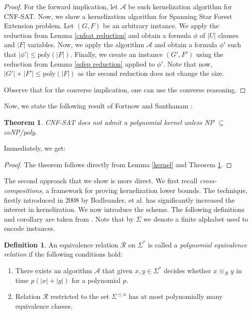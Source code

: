 \documentclass[en]{pracamgr}
\newtheorem{theorem}{Theorem}
\theoremstyle{definition}
\newtheorem{definition}{Definition}
\newcommand{\ssfep}{{\sc Spanning Star Forest Extension}}
\newcommand{\cnfsat}{{\sc CNF-SAT}}
\begin{document}
\begin{proof}
	For the forward implication, let $\mathcal{A}$ be such kernelization algorithm for \cnfsat{}. Now, we show a kernelization algorithm for \ssfep{} problem. Let $(G,F)$ be an arbitrary instance. We apply the reduction from Lemma \ref{cnfsat reduction} and obtain a formula $\phi$ of $|U|$ clauses and $|F|$ variables. Now, we apply the algorithm $\mathcal{A}$ and obtain a formula $\phi'$ such that $|\phi'| \leq \textrm{poly}(|F|)$. Finally, we create an instance $(G',F')$ using the reduction from Lemma \ref{ssfep reduction} applied to $\phi'$. Note that now, $|G'|+|F'| \leq \textrm{poly}(|F|)$ as the second reduction does not change the size.
	
	Observe that for the converse implication, one can use the converse reasoning.
\end{proof}

Now, we state the following result of Fortnow and Santhanam \cite{CNFSAT}:

\begin{theorem}\label{Fortnow}
	\cnfsat{} does not admit a polynomial kernel unless NP $\subseteq$ coNP/poly.
\end{theorem}

Immediately, we get:

\thmssfepnokernel*

\begin{proof}
	The theorem follows directly from Lemma \ref{kernel} and Theorem \ref{Fortnow}.
\end{proof}

The second approach that we show is more direct. We first recall \textit{cross-compositions}, a framework for proving kernelization lower bounds. The technique, firstly introduced in 2008 by Bodleander, et al. \cite{Bodlaender} has significantly increased the interest in kernelization. We now introduce the scheme. The following definitions and corollary are taken from \cite{ParAlg}. Note that by $\Sigma$ we denote a finite alphabet used to encode instances.

\begin{definition}\label{polynomial equivalence relation}
	An equivalence relation $\mathcal{R}$ on $\Sigma^*$ is called a \textit{polynomial equivalence relation} if the following conditions hold:
	\begin{enumerate}
		\item There exists an algorithm $\mathcal{A}$ that given $x,y \in \Sigma^*$ decides whether $x \equiv_{\mathcal{R}} y$ in time $p(|x|+|y|)$ for a polynomial $p$.
		\item Relation $\mathcal{R}$ restricted to the set $\Sigma^{\leq n}$ has at most polynomially many equivalence classes.
	\end{enumerate}
\end{definition}
\end{document}
